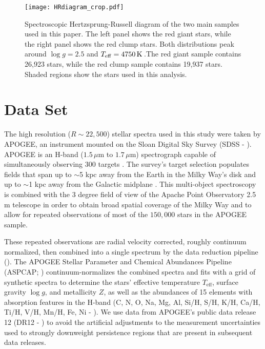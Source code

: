 \documentclass[a4paper,fleqn,usenatbib]{mnras}
\newcommand       \teff     {{T_{\mathrm{eff}}}}
\newcommand		  \K        {\,{\rm K}\,}
\newcommand       \mum      {{\,\mu\mathrm{m}}}
\begin{document}
\begin{figure*}
\centering
\texttt{[image: HRdiagram\_crop.pdf]}
\caption{Spectroscopic Hertzsprung-Russell diagram of the two main samples used in this paper. The left panel shows the red giant stars, while the right panel shows the red clump stars. Both distributions peak around $\log g=2.5$ and $\teff=4750\K$.The red giant sample contains 26,923 stars, while the red clump sample contains 19,937 stars. Shaded regions show the stars used in this analysis.}
\label{fig:HR}
\end{figure*}

\section{Data Set}
\label{sec:data}
The high resolution ($R\sim 22,500$) stellar spectra used in this study were taken by APOGEE, an instrument mounted on the Sloan Digital Sky Survey (SDSS - \citealt{Eisenstein2011}). APOGEE is an H-band ($1.5\mum$ to $1.7\mum$) spectrograph capable of simultaneously observing 300 targets \citep{Majewski2015}. The survey's target selection populates fields that span up to $\sim$5 kpc away from the Earth in the Milky Way's disk and up to $\sim$1 kpc away from the Galactic midplane \citep{Zasowski2013}. This multi-object spectroscopy is combined with the 3 degree field of view of the Apache Point Observatory 2.5 m telescope \citep{Gunn2006} in order to obtain broad spatial coverage of the Milky Way and to allow for repeated observations of most of the $150,000$ stars in the APOGEE sample. 

These repeated observations are radial velocity corrected, roughly continuum normalized, then combined into a single spectrum by the data reduction pipeline (\citealt{Nidever2015}). The APOGEE Stellar Parameter and Chemical Abundances Pipeline (ASPCAP; \citealt{Perez2015}) continuum-normalizes the combined spectra and fits with a grid of synthetic spectra \citep{Zamora2015} to determine the stars' effective temperature $\teff$, surface gravity $\log g$, and metallicity $Z$, as well as the abundances of 15 elements with absorption features in the H-band (C, N, O, Na, Mg, Al, Si/H, S/H, K/H, Ca/H, Ti/H, V/H, Mn/H, Fe, Ni - \citealt{Holtzman2015}). We use data from APOGEE's public data release 12 (DR12 - \citealt{Alam2015}) to avoid the artificial adjustments to the measurement uncertainties used to strongly downweight persistence regions that are present in subsequent data releases.
\end{document}
